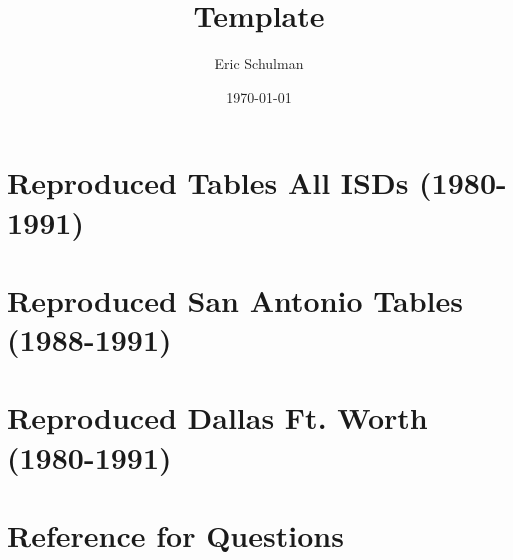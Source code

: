 \documentclass{article}
\title{Template}
\author{Eric Schulman}
\date{\today}
\begin{document}
\section{Reproduced Tables All ISDs (1980-1991)}





\pagebreak

\section{Reproduced San Antonio Tables (1988-1991)}





\pagebreak

\section{Reproduced Dallas Ft. Worth (1980-1991)}





\pagebreak

\section{Reference for Questions}




\end{document}
